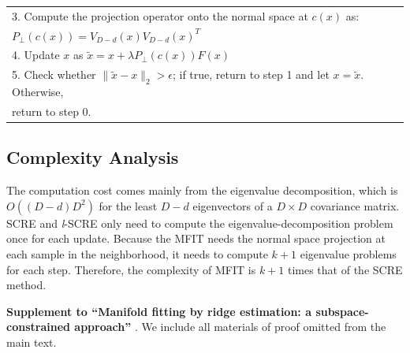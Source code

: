 \documentclass[aos,preprint]{imsart}
\theoremstyle{remark}
\begin{document}
\begin{appendix}
\begin{table}[t]
{\begin{tabular}{l}
\hspace{1cm} %
3. Compute the projection operator onto the normal space at $c(x)$ as: \\
 \hspace{3.5cm} ${P}_{\perp}(c(x)) = V_{D-d}(x)V_{D-d}(x)^T$\\
\hspace{1cm} 4. Update $x$ as $\tilde{x} = x + \lambda { P}_{\perp}(c(x)) F(x)$\\ 
\hspace{1cm} 5. Check whether $\| \tilde{x} -x\|_2 > \epsilon$; if true, return to step 1 and let $x = \tilde{x}$. Otherwise, \\
\hspace{1.5cm}return to step 0.\\
\hline
\end{tabular}}
\label{algorithm}
\end{table}

\subsection{Complexity Analysis}
The computation cost comes mainly from the eigenvalue decomposition, which is $O((D-d)D^2)$ for the least $D-d$ eigenvectors of a $D\times D$ covariance matrix. SCRE and {\it l}-SCRE only need to compute the eigenvalue-decomposition problem once for each update. Because the MFIT needs the normal space projection at each sample in the neighborhood, it needs to compute $k+1$ eigenvalue problems for each step. Therefore, the complexity of MFIT is $k+1$ times that of the SCRE method.
\end{appendix}

\begin{supplement}
\textbf{Supplement to ``Manifold fitting by ridge estimation: a subspace-constrained approach''} \citep{supplement}. We include all materials of proof omitted from the main text.
\end{supplement}



\end{document}
